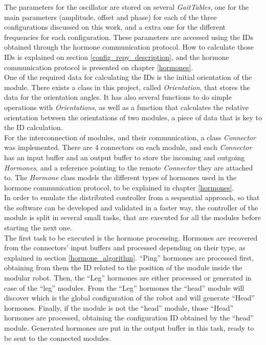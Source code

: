 The parameters for the oscillator are stored on several \emph{GaitTables}, one for the main parameters (amplitude, offset and phase) for each of the three configurations discussed on this work, and a extra one for the different frequencies for each configuration. These parameters are accessed using the IDs obtained through the hormone communication protocol. How to calculate those IDs is explained on section \ref{config_repy_description}, and the hormone communication protocol is presented on chapter \ref{hormones}.\\

One of the required data for calculating the IDs is the initial orientation of the module. There exists a class in this project, called \emph{Orientation}, that stores the data for the orientation angles. It has also several functions to do simple operations with \emph{Orientations}, as well as a function that calculates the relative orientation between the orientations of two modules, a piece of data that is key to the ID calculation.\\

For the interconnection of modules, and their communication, a class \emph{Connector} was implemented. There are 4 connectors on each module, and each \emph{Connector} has an input buffer and an output buffer to store the incoming and outgoing \emph{Hormones}, and a reference pointing to the remote \emph{Connector} they are attached to. The \emph{Hormone} class models the different types of hormones used in the hormone communication protocol, to be explained in chapter \ref{hormones}.\\ 

In order to emulate the distributed controller from a sequential approach, so that the software can be developed and validated in a faster way, the controller of the module is split in several small tasks, that are executed for all the modules before starting the next one.\\

The first task to be executed is the hormone processing. Hormones are recovered from the connectors' input buffers and processed depending on their type, as explained in section \ref{hormone_algorithm}. ``Ping'' hormones are processed first, obtaining from them the ID related to the position of the module inside the modular robot.  Then, the ``Leg'' hormones are either processed or generated in case of the ``leg'' modules. From the ``Leg'' hormones the ``head'' module will discover which is the global configuration of the robot and will generate ``Head'' hormones. Finally, if the module is not the ``head'' module,  those ``Head'' hormones are processed, obtaining the configuration ID obtained by the ``head'' module. Generated hormones are put in the output buffer in this task, ready to be sent to the connected modules.\\

